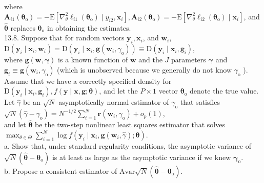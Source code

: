 \documentclass[10pt]{article}
\begin{document}
where $\mathbf{A}_{i 1}\left(\boldsymbol{\theta}_{\mathrm{o}}\right)=-\mathrm{E}\left[\nabla_{\theta}^{2} \ell_{i 1}\left(\boldsymbol{\theta}_{\mathrm{o}}\right) \mid y_{i 2}, \mathbf{x}_{i}\right], \mathbf{A}_{i 2}\left(\boldsymbol{\theta}_{\mathrm{o}}\right)=-\mathrm{E}\left[\nabla_{\theta}^{2} \ell_{i 2}\left(\boldsymbol{\theta}_{\mathrm{o}}\right) \mid \mathbf{x}_{i}\right]$, and $\hat{\boldsymbol{\theta}}$ replaces $\boldsymbol{\theta}_{\mathrm{o}}$ in obtaining the estimates.\\
13.8. Suppose that for random vectors $\mathbf{y}_{i}, \mathbf{x}_{i}$, and $\mathbf{w}_{i}$,\\
$\mathrm{D}\left(\mathbf{y}_{i} \mid \mathbf{x}_{i}, \mathbf{w}_{i}\right)=\mathrm{D}\left(\mathbf{y}_{i} \mid \mathbf{x}_{i}, \mathbf{g}\left(\mathbf{w}_{i}, \gamma_{\mathrm{o}}\right)\right) \equiv \mathrm{D}\left(\mathbf{y}_{i} \mid \mathbf{x}_{i}, \mathbf{g}_{i}\right)$,\\
where $\mathbf{g}(\mathbf{w}, \boldsymbol{\gamma})$ is a known function of $\mathbf{w}$ and the $J$ parameters $\boldsymbol{\gamma}$ and $\mathbf{g}_{i} \equiv \mathbf{g}\left(\mathbf{w}_{i}, \gamma_{\mathrm{o}}\right)$ (which is unobserved because we generally do not know $\gamma_{\mathrm{o}}$ ). Assume that we have a correctly specified density for $\mathrm{D}\left(\mathbf{y}_{i} \mid \mathbf{x}_{i}, \mathbf{g}_{i}\right), f(\mathbf{y} \mid \mathbf{x}, \mathbf{g} ; \boldsymbol{\theta})$, and let the $P \times 1$ vector $\boldsymbol{\theta}_{\mathrm{o}}$ denote the true value. Let $\hat{\gamma}$ be an $\sqrt{N}$-asymptotically normal estimator of $\gamma_{\mathrm{o}}$ that satisfies\\
$\sqrt{N}\left(\hat{\gamma}-\gamma_{\mathrm{o}}\right)=N^{-1 / 2} \sum_{i=1}^{N} \mathbf{r}\left(\mathbf{w}_{i}, \gamma_{\mathrm{o}}\right)+o_{p}(1)$,\\
and let $\hat{\boldsymbol{\theta}}$ be the two-step nonlinear least squares estimator that solves\\
$\max _{\theta \in \Theta} \sum_{i=1}^{N} \log f\left(\mathbf{y}_{i} \mid \mathbf{x}_{i}, \mathbf{g}\left(\mathbf{w}_{i}, \hat{\gamma}\right) ; \boldsymbol{\theta}\right)$.\\
a. Show that, under standard regularity conditions, the asymptotic variance of $\sqrt{N}\left(\hat{\boldsymbol{\theta}}-\boldsymbol{\theta}_{\mathrm{o}}\right)$ is at least as large as the asymptotic variance if we knew $\boldsymbol{\gamma}_{\mathrm{o}}$.\\
b. Propose a consistent estimator of $\mathrm{Avar} \sqrt{N}\left(\hat{\boldsymbol{\theta}}-\boldsymbol{\theta}_{\mathrm{o}}\right)$.\\
\end{document}
